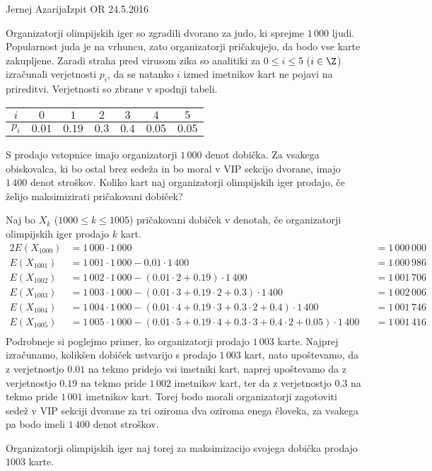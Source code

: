 \begin{naloga}{Jernej Azarija}{Izpit OR 24.5.2016}
\begin{vprasanje}
Organizatorji olimpijskih iger so zgradili dvorano za judo,
ki sprejme $1\,000$ ljudi.
Popularnost juda je na vrhuncu,
zato organizatorji pričakujejo, da bodo vse karte zakupljene.
Zaradi straha pred virusom zika so analitiki
za $0 \le i \le 5$ ($i \in \Z$) izračunali verjetnosti $p_i$,
da se natanko $i$ izmed imetnikov kart ne pojavi na prireditvi.
Verjetnosti so zbrane v spodnji tabeli.
\begin{center}
\begin{tabular}{c|cccccc}
$i$   & $0$    & $1$    & $2$   & $3$   & $4$    & $5$ \\ \hline
$p_i$ & $0.01$ & $0.19$ & $0.3$ & $0.4$ & $0.05$ & $0.05$
\end{tabular}
\end{center}

S prodajo vstopnice imajo organizatorji $1\,000$ denot dobička.
Za vsakega obiskovalca,
ki bo ostal brez sedeža in bo moral v VIP sekcijo dvorane,
imajo $1\,400$ denot stroškov.
Koliko kart naj organizatorji olimpijskih iger prodajo,
če želijo maksimizirati pričakovani dobiček?
\end{vprasanje}

\begin{odgovor}
    Naj bo $X_k$ ($1000 \le k \le 1005$) pričakovani dobiček v denotah,
    če organizatorji olimpijskih iger prodajo $k$ kart.
    \begin{alignat*}{2}
    E(X_{1000}) &= 1\,000 \cdot 1\,000 &&= 1\,000\,000 \\
    E(X_{1001}) &= 1\,001 \cdot 1\,000 - 0.01 \cdot 1\,400 &&= 1\,000\,986 \\
    E(X_{1002}) &= 1\,002 \cdot 1\,000 - (0.01 \cdot 2 + 0.19) \cdot 1\,400 &&= 1\,001\,706 \\
    E(X_{1003}) &= 1\,003 \cdot 1\,000 - (0.01 \cdot 3 + 0.19 \cdot 2 + 0.3) \cdot 1\,400 &&= 1\,002\,006 \\
    E(X_{1004}) &= 1\,004 \cdot 1\,000 - (0.01 \cdot 4 + 0.19 \cdot 3 + 0.3 \cdot 2 + 0.4) \cdot 1\,400 &&= 1\,001\,746 \\
    E(X_{1005}) &= 1\,005 \cdot 1\,000 - (0.01 \cdot 5 + 0.19 \cdot 4 + 0.3 \cdot 3 + 0.4 \cdot 2 + 0.05) \cdot 1\,400 &&= 1\,001\,416 \\
    \end{alignat*}
    Podrobneje si poglejmo primer, ko organizatorji prodajo $1\,003$ karte.
    Najprej izračunamo, kolikšen dobiček ustvarijo s prodajo $1\,003$ kart,
    nato upoštevamo, da z ve\-rjet\-nost\-jo $0.01$ na tekmo pridejo
    vsi imetniki kart, naprej upoštevamo da z ve\-rjet\-nost\-jo $0.19$ na tekmo
    pride $1\,002$ imetnikov kart, ter da z ve\-rjet\-nost\-jo $0.3$ na tekmo pride
    $1\,001$ imetnikov kart.
    Torej bodo morali organizatorji zagotoviti sedež v VIP sekciji dvorane za tri oziroma dva
    oziroma enega človeka, za vsakega pa bodo imeli $1\,400$ denot stroškov.

    Organizatorji olimpijskih iger naj torej za maksimizacijo svojega dobička prodajo $1003$ karte.
\end{odgovor}

\end{naloga}

